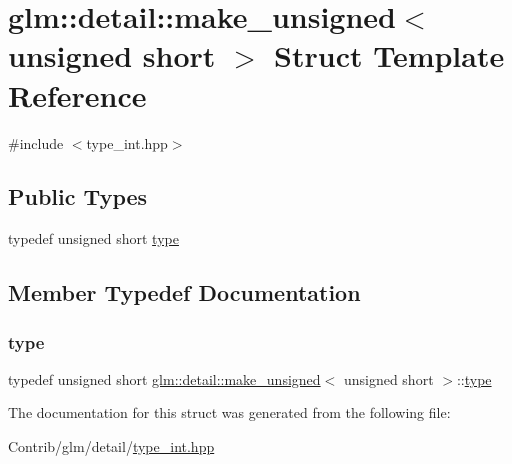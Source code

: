 \hypertarget{structglm_1_1detail_1_1make__unsigned_3_01unsigned_01short_01_4}{}\section{glm\+:\+:detail\+:\+:make\+\_\+unsigned$<$ unsigned short $>$ Struct Template Reference}
\label{structglm_1_1detail_1_1make__unsigned_3_01unsigned_01short_01_4}


{\ttfamily \#include $<$type\+\_\+int.\+hpp$>$}

\subsection*{Public Types}
\begin{DoxyCompactItemize}
\item 
typedef unsigned short \mbox{\hyperlink{structglm_1_1detail_1_1make__unsigned_3_01unsigned_01short_01_4_a42829000435f69c3a00675b6914f0d33}{type}}
\end{DoxyCompactItemize}


\subsection{Member Typedef Documentation}
\mbox{\label{structglm_1_1detail_1_1make__unsigned_3_01unsigned_01short_01_4_a42829000435f69c3a00675b6914f0d33}} 
\subsubsection{\texorpdfstring{type}{type}}
{\footnotesize\ttfamily typedef unsigned short \mbox{\hyperlink{structglm_1_1detail_1_1make__unsigned}{glm\+::detail\+::make\+\_\+unsigned}}$<$ unsigned short $>$\+::\mbox{\hyperlink{structglm_1_1detail_1_1make__unsigned_3_01unsigned_01short_01_4_a42829000435f69c3a00675b6914f0d33}{type}}}



The documentation for this struct was generated from the following file\+:\begin{DoxyCompactItemize}
\item 
Contrib/glm/detail/\mbox{\hyperlink{type__int_8hpp}{type\+\_\+int.\+hpp}}\end{DoxyCompactItemize}
